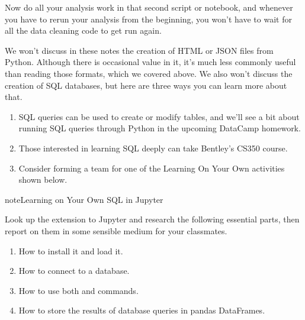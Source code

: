 \documentclass[letterpaper,10pt,english]{jupyterBook}
\begin{document}
\sphinxAtStartPar
Now do all your analysis work in that second script or notebook, and whenever you have to re\sphinxhyphen{}run your analysis from the beginning, you won’t have to wait for all the data cleaning code to get run again.

\sphinxAtStartPar
We won’t discuss in these notes the creation of HTML or JSON files from Python.  Although there is occasional value in it, it’s much less commonly useful than reading those formats, which we covered above.  We also won’t discuss the creation of SQL databases, but here are three ways you can learn more about that.
\begin{enumerate}
%
\item {} 
\sphinxAtStartPar
SQL queries can be used to create or modify tables, and we’ll see a bit about running SQL queries through Python in the upcoming DataCamp homework.

\item {} 
\sphinxAtStartPar
Those interested in learning SQL deeply can take Bentley’s CS350 course.

\item {} 
\sphinxAtStartPar
Consider forming a team for one of the Learning On Your Own activities shown below.

\end{enumerate}

\begin{sphinxadmonition}{note}{Learning on Your Own \sphinxhyphen{} SQL in Jupyter}

\sphinxAtStartPar
Look up the  extension to Jupyter and research the following essential parts, then report on them in some sensible medium for your classmates.
\begin{enumerate}
%
\item {} 
\sphinxAtStartPar
How to install it and load it.

\item {} 
\sphinxAtStartPar
How to connect to a database.

\item {} 
\sphinxAtStartPar
How to use both  and  commands.

\item {} 
\sphinxAtStartPar
How to store the results of database queries in pandas DataFrames.

\end{enumerate}
\end{sphinxadmonition}
\end{document}
